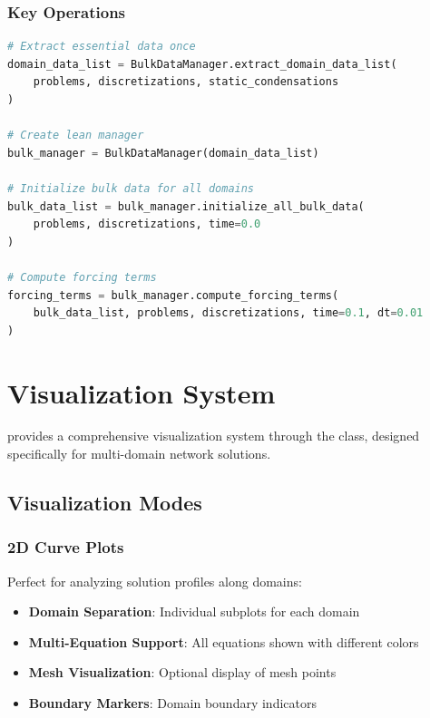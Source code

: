 \subsubsection{Key Operations}
\begin{lstlisting}[language=Python, caption=Bulk Data Management]
# Extract essential data once
domain_data_list = BulkDataManager.extract_domain_data_list(
    problems, discretizations, static_condensations
)

# Create lean manager
bulk_manager = BulkDataManager(domain_data_list)

# Initialize bulk data for all domains
bulk_data_list = bulk_manager.initialize_all_bulk_data(
    problems, discretizations, time=0.0
)

# Compute forcing terms
forcing_terms = bulk_manager.compute_forcing_terms(
    bulk_data_list, problems, discretizations, time=0.1, dt=0.01
)
\end{lstlisting}

\section{Visualization System}
\label{sec:visualization}

\bionetflux{} provides a comprehensive visualization system through the  class, designed specifically for multi-domain network solutions.

\subsection{Visualization Modes}

\subsubsection{2D Curve Plots}
Perfect for analyzing solution profiles along domains:
\begin{itemize}
    \item \textbf{Domain Separation}: Individual subplots for each domain
    \item \textbf{Multi-Equation Support}: All equations shown with different colors
    \item \textbf{Mesh Visualization}: Optional display of mesh points
    \item \textbf{Boundary Markers}: Domain boundary indicators
\end{itemize}

